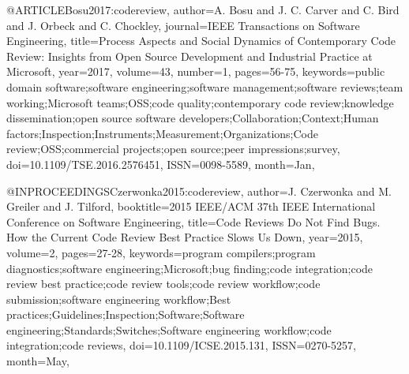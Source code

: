 \documentclass[runningheads,a4paper]{llncs}
\begin{document}

@ARTICLE{Bosu2017:codereview, 
author={A. Bosu and J. C. Carver and C. Bird and J. Orbeck and C. Chockley}, 
journal={IEEE Transactions on Software Engineering}, 
title={Process Aspects and Social Dynamics of Contemporary Code Review: Insights from Open Source Development and Industrial Practice at Microsoft}, 
year={2017}, 
volume={43}, 
number={1}, 
pages={56-75}, 
keywords={public domain software;software engineering;software management;software reviews;team working;Microsoft teams;OSS;code quality;contemporary code review;knowledge dissemination;open source software developers;Collaboration;Context;Human factors;Inspection;Instruments;Measurement;Organizations;Code review;OSS;commercial projects;open source;peer impressions;survey}, 
doi={10.1109/TSE.2016.2576451}, 
ISSN={0098-5589}, 
month={Jan},}

@INPROCEEDINGS{Czerwonka2015:codereview, 
author={J. Czerwonka and M. Greiler and J. Tilford}, 
booktitle={2015 IEEE/ACM 37th IEEE International Conference on Software Engineering}, 
title={Code Reviews Do Not Find Bugs. How the Current Code Review Best Practice Slows Us Down}, 
year={2015}, 
volume={2}, 
pages={27-28}, 
keywords={program compilers;program diagnostics;software engineering;Microsoft;bug finding;code integration;code review best practice;code review tools;code review workflow;code submission;software engineering workflow;Best practices;Guidelines;Inspection;Software;Software engineering;Standards;Switches;Software engineering workflow;code integration;code reviews}, 
doi={10.1109/ICSE.2015.131}, 
ISSN={0270-5257}, 
month={May},}
\end{document}
